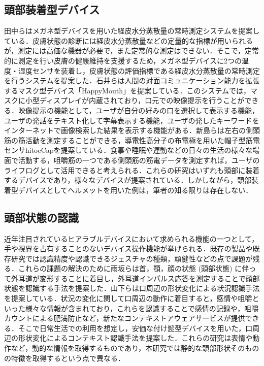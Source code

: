 \documentclass[Japanese]{dicomopapers}
\begin{document}
\subsection{頭部装着型デバイス}
田中らはメガネ型デバイスを用いた経皮水分蒸散量の常時測定システムを提案している\cite{glasses}．皮膚状態の診断には経皮水分蒸散量などの定量的な指標が用いられるが，測定には高価な機器が必要で，また定常的な測定はできない．そこで，定常的に測定を行い皮膚の健康維持を支援するため，メガネ型デバイスに2つの温度・湿度センサを装着し，皮膚状態の評価指標である経皮水分蒸散量の常時測定を行うシステムを提案した．石井らは人間の対面コミュニケーション能力を拡張するマスク型デバイス「HappyMouth」を提案している\cite{happymouth}．このシステムでは，マスクに小型ディスプレイが内蔵されており，口元での映像提示を行うことができる．映像提示の機能として，ユーザが自分の好みの口を選択して表示する機能，ユーザの発話をテキスト化して字幕表示する機能，ユーザの発したキーワードをインターネットで画像検索した結果を表示する機能がある．新島らは左右の側頭筋の筋活動を測定することができる，導電性高分子の布電極を用いた帽子型筋電センサhitoeCapを提案している\cite{cap_sensor}．食事や睡眠や運動などの日々の生活の様々な場面で活動する，咀嚼筋の一つである側頭筋の筋電データを測定すれば，ユーザのライフログとして活用できると考えられる．これらの研究はいずれも頭部に装着するデバイスであり，様々なデバイスが提案されている．しかしながら，頭部装着型デバイスとしてヘルメットを用いた例は，筆者の知る限りは存在しない．

\subsection{頭部状態の認識}
近年注目されているヒアラブルデバイスにおいて求められる機能の一つとして，手や視界を占有することのないデバイス操作機能が挙げられる．既存の製品や既存研究では認識精度や認識できるジェスチャの種類，頑健性などの点で課題が残る．これらの課題の解決のために雨坂らは首，顎，顔の状態 (頭部状態) に伴って外耳道が変形することに着目し，外耳道インパルス応答を測定することで頭部状態を認識する手法を提案した\cite{ear}．山下らは口周辺の形状変化による状況認識手法を提案している\cite{mouth}．状況の変化に関して口周辺の動作に着目すると，感情や咀嚼といった様々な情報が含まれており，これらを認識することで感情の記録や，咀嚼カウントによる肥満防止など，新たなコンテキストアウェアサービスが提供できる．そこで日常生活での利用を想定し，安価な付け髭型デバイスを用いた，口周辺の形状変化によるコンテキスト認識手法を提案した．これらの研究は表情や動作など，動的な情報を取得するものであり，本研究では静的な頭部形状そのものの特徴を取得するという点で異なる．
\end{document}
